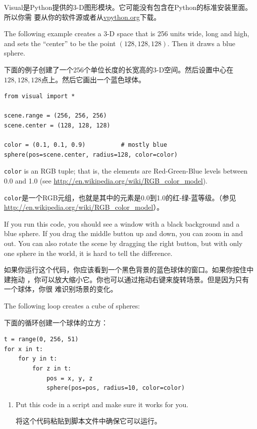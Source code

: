 \documentclass[10pt]{book}
\begin{document}
\begin{CJK}{UTF8}{gbsn}
\begin{exercise}
Visual是Python提供的3-D图形模块。它可能没有包含在Python的标准安装里面。所以你需
要从你的软件源或者从\url{vpython.org}下载。

The following example creates a 3-D space that is 256 units
wide, long and high, and sets the ``center'' to be the
point $(128,128,128)$.  Then it draws a blue sphere.

下面的例子创建了一个256个单位长度的长宽高的3-D空间。然后设置中心在
${128,128,128}$点上。然后它画出一个蓝色球体。

\begin{verbatim}
from visual import *

scene.range = (256, 256, 256)
scene.center = (128, 128, 128)

color = (0.1, 0.1, 0.9)          # mostly blue
sphere(pos=scene.center, radius=128, color=color)
\end{verbatim}

{\tt color} is an RGB tuple; that is, the elements are Red-Green-Blue
levels between 0.0 and 1.0 (see
\url{http://en.wikipedia.org/wiki/RGB_color_model}).

{\tt color}是一个RGB元组，也就是其中的元素是0.0到1.0的红-绿-蓝等级。（参见
\url{http://en.wikipedia.org/wiki/RGB_color_model}）。

If you run this code, you should see a window with a black
background and a blue sphere.  If you drag the middle button
up and down, you can zoom in and out.  You can also rotate
the scene by dragging the right button, but with only one
sphere in the world, it is hard to tell the difference.

如果你运行这个代码，你应该看到一个黑色背景的蓝色球体的窗口。如果你按住中建拖动
，你可以放大缩小它。你也可以通过拖动右键来旋转场景。但是因为只有一个球体，你很
难识别场景的变化。

The following loop creates a cube of spheres:

下面的循环创建一个球体的立方：

\begin{verbatim}
t = range(0, 256, 51)
for x in t:
    for y in t:
        for z in t:
            pos = x, y, z
            sphere(pos=pos, radius=10, color=color)
\end{verbatim}

\begin{enumerate}

\item Put this code in a script and make sure it works for
you.

将这个代码粘贴到脚本文件中确保它可以运行。


\end{enumerate}
\end{exercise}
\end{CJK}
\end{document}
